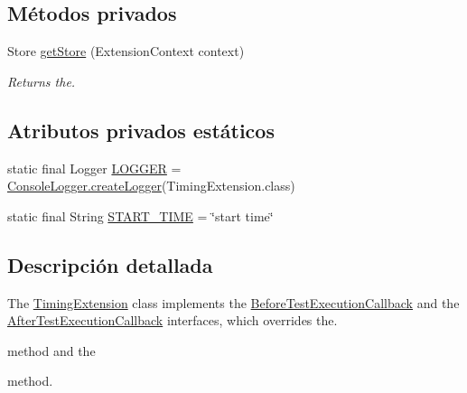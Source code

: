 \subsection*{Métodos privados}
\begin{DoxyCompactItemize}
\item 
Store \mbox{\hyperlink{classcom_1_1ruralhousejsf_1_1extension_1_1_timing_extension_a489c3097fd687a25391189f3fec56fa8}{get\+Store}} (Extension\+Context context)
\begin{DoxyCompactList}\small\item\em Returns the. \end{DoxyCompactList}\end{DoxyCompactItemize}
\subsection*{Atributos privados estáticos}
\begin{DoxyCompactItemize}
\item 
static final Logger \mbox{\hyperlink{classcom_1_1ruralhousejsf_1_1extension_1_1_timing_extension_a6c2790b974e4ae4484a4ad0f67ead486}{L\+O\+G\+G\+ER}} = \mbox{\hyperlink{classcom_1_1ruralhousejsf_1_1logger_1_1_console_logger_a520321643663e37d95761134a35505cd}{Console\+Logger.\+create\+Logger}}(Timing\+Extension.\+class)
\item 
static final String \mbox{\hyperlink{classcom_1_1ruralhousejsf_1_1extension_1_1_timing_extension_ad283289939c7b6e42277a8b06db6a765}{S\+T\+A\+R\+T\+\_\+\+T\+I\+ME}} = \char`\"{}start time\char`\"{}
\end{DoxyCompactItemize}


\subsection{Descripción detallada}
The \mbox{\hyperlink{classcom_1_1ruralhousejsf_1_1extension_1_1_timing_extension}{Timing\+Extension}} class implements the \mbox{\hyperlink{}{Before\+Test\+Execution\+Callback}} and the \mbox{\hyperlink{}{After\+Test\+Execution\+Callback}} interfaces, which overrides the. 


\begin{DoxyCode}{0}
\end{DoxyCode}
 method and the
\begin{DoxyCode}{0}
\end{DoxyCode}
 method. 

